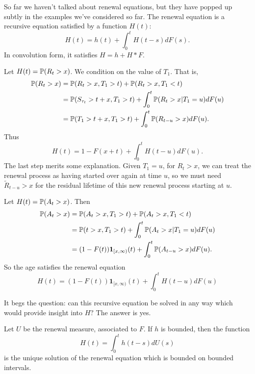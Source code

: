 \documentclass[12pt]{article}
\begin{document}
So far we haven't talked about renewal equations, but they have popped up subtly in the examples we've considered so far. The renewal equation is a recursive equation satisfied by a function $H(t)$:
\[
H(t) = h(t) + \int_0^t H(t-s) dF(s).
\]
In convolution form, it satisfies $H = h + H * F$. \\

\begin{example}
Let $H(t) = \mathbb{P}(R_t > x)$. We condition on the value of $T_1$. That is,
\begin{align*}
    \mathbb{P}(R_t > x) &= \mathbb{P}(R_t > x, T_1 > t) + \mathbb{P}(R_t > x, T_1 < t) \\
    & = \mathbb{P}(S_{\tau_t} > t + x, T_1 > t) + \int_0^t\mathbb{P}(R_t > x| T_1 = u) dF(u) \\
    & = \mathbb{P}(T_1 > t+x, T_1 > t) + \int_0^t\mathbb{P}(R_{t-u} > x) dF(u).
\end{align*}
Thus
\[
H(t) = 1 - F(x+t) + \int_0^t H(t-u) dF(u).
\]
The last step merits some explanation. Given $T_1 = u$, for $R_t > x$, we can treat the renewal process as having started over again at time $u$, so we must need $\tilde{R}_{t-u} > x$ for the residual lifetime of this new renewal process starting at $u.$

\end{example}


\begin{example}
Let $H(t) = \mathbb{P}(A_t > x)$. Then
\begin{align*}
    \mathbb{P}(A_t > x) &= \mathbb{P}(A_t > x, T_1 > t) + \mathbb{P}(A_t > x, T_1 < t) \\
    & = \mathbb{P}(t > x, T_1 > t) + \int_0^t\mathbb{P}(A_t > x| T_1 = u) dF(u) \\
    & = (1 - F(t))\mathbf{1}_{[x,\infty)}(t) + \int_0^t\mathbb{P}(A_{t-u} > x) dF(u).
\end{align*}
So the age satisfies the renewal equation
\[
H(t) = (1 - F(t))\mathbf{1}_{[x,\infty)}(t) + \int_0^t H(t-u) dF(u)
\]
\end{example}



It begs the question: can this recursive equation be solved in any way which would provide insight into $H?$ The answer is yes.

\begin{theorem}
Let $U$ be the renewal measure, associated to $F$. If $h$ is bounded, then the function
\[
H(t) = \int_0^t h(t-s)dU(s)
\]
is the unique solution of the renewal equation which is bounded on bounded intervals.
\end{theorem}
\end{document}
